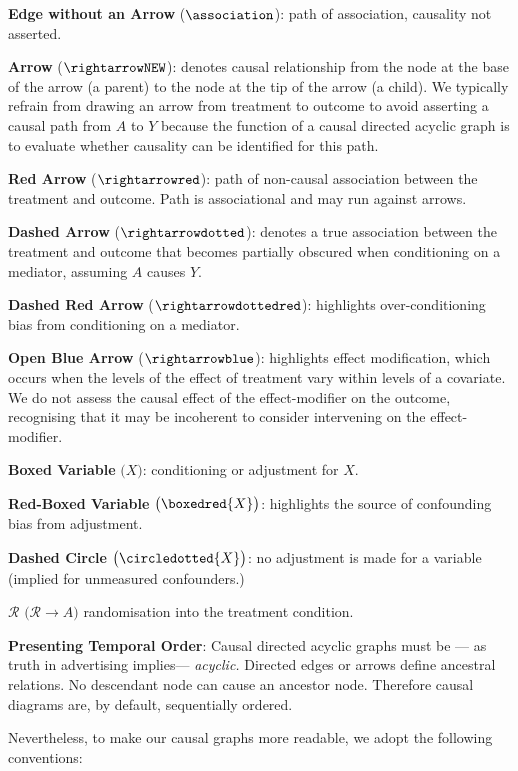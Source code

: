 \documentclass[
  single column]{article}
\begin{document}
\textbf{Edge without an Arrow} (\(\association\)): path of association,
causality not asserted.

\textbf{Arrow} (\(\rightarrowNEW\)): denotes causal relationship from
the node at the base of the arrow (a parent) to the node at the tip of
the arrow (a child). We typically refrain from drawing an arrow from
treatment to outcome to avoid asserting a causal path from \(A\) to
\(Y\) because the function of a causal directed acyclic graph is to
evaluate whether causality can be identified for this path.

\textbf{Red Arrow} (\(\rightarrowred\)): path of non-causal association
between the treatment and outcome. Path is associational and may run
against arrows.

\textbf{Dashed Arrow} (\(\rightarrowdotted\)): denotes a true
association between the treatment and outcome that becomes partially
obscured when conditioning on a mediator, assuming \(A\) causes \(Y\).

\textbf{Dashed Red Arrow} (\(\rightarrowdottedred\)): highlights
over-conditioning bias from conditioning on a mediator.

\textbf{Open Blue Arrow} (\(\rightarrowblue\)): highlights effect
modification, which occurs when the levels of the effect of treatment
vary within levels of a covariate. We do not assess the causal effect of
the effect-modifier on the outcome, recognising that it may be
incoherent to consider intervening on the effect-modifier.

\textbf{Boxed Variable} \(\big(\boxed{X}\big)\): conditioning or
adjustment for \(X\).

\textbf{Red-Boxed Variable} \(\big(\boxedred{X}\big)\): highlights the
source of confounding bias from adjustment.

\textbf{Dashed Circle} \(\big( \circledotted{X}\big)\): no adjustment is
made for a variable (implied for unmeasured confounders.)

\textbf{\(\mathbf{\mathcal{R}}\)}
\(\big(\mathcal{R} \rightarrow A\big)\) randomisation into the treatment
condition.

\textbf{Presenting Temporal Order}: Causal directed acyclic graphs must
be --- as truth in advertising implies--- \emph{acyclic.} Directed edges
or arrows define ancestral relations. No descendant node can cause an
ancestor node. Therefore causal diagrams are, by default, sequentially
ordered.

Nevertheless, to make our causal graphs more readable, we adopt the
following conventions:
\end{document}
